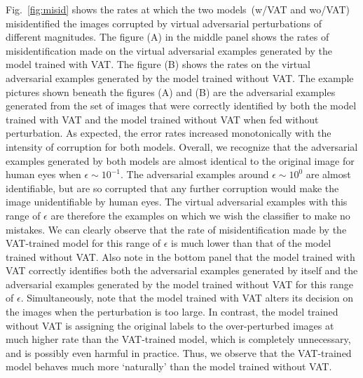 \documentclass[10pt,journal,compsoc]{IEEEtran}
\begin{document}
Fig.~\ref{fig:misid} shows the rates at which the two models~(w/VAT and wo/VAT) misidentified the images corrupted by virtual adversarial perturbations of different magnitudes. 
The figure (A) in the middle panel shows the rates of misidentification made on the virtual adversarial examples generated by the model trained with VAT. The figure (B) shows the rates on the virtual adversarial examples generated by the model trained without VAT. 
The example pictures shown beneath the figures (A) and (B) are the adversarial examples generated from the set of images that were correctly identified by both the model trained with VAT and the model trained without VAT when fed without perturbation.
As expected, the error rates increased monotonically with the intensity of corruption for both models. 
Overall, we recognize that the adversarial examples generated by both models are almost identical to the original image for human eyes when $\epsilon \sim 10^{-1}$.
The adversarial examples around $\epsilon \sim 10^0$ are almost identifiable, but are so corrupted that any further corruption would make the image unidentifiable by human eyes.
The virtual adversarial examples with this range of $\epsilon$ are therefore the examples on which we wish the classifier to make no mistakes. 
We can clearly observe that the rate of misidentification made by the VAT-trained model for this range of $\epsilon$ is much lower than that of the model trained without VAT. 
Also note in the bottom panel that the model trained with VAT correctly identifies both the adversarial examples generated by itself and the adversarial examples generated by the model trained without VAT for this range of $\epsilon$.  
Simultaneously, note that the model trained with VAT alters its decision on the images when the perturbation is too large.
In contrast, the model trained without VAT is assigning the original labels to the over-perturbed images at much higher rate than the VAT-trained model, which is completely unnecessary, and is possibly even harmful in practice.
Thus, we observe that the VAT-trained model behaves much more `naturally' than the model trained without VAT.
\end{document}
